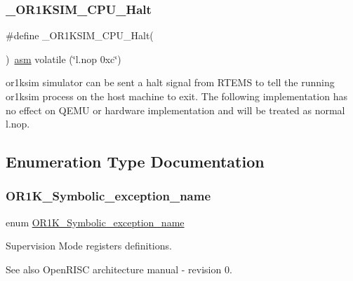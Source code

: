 \subsubsection{\texorpdfstring{\_OR1KSIM\_CPU\_Halt}{\_OR1KSIM\_CPU\_Halt}}
{\footnotesize\ttfamily \#define \+\_\+\+O\+R1\+K\+S\+I\+M\+\_\+\+C\+P\+U\+\_\+\+Halt(\begin{DoxyParamCaption}{ }\end{DoxyParamCaption})~\mbox{\hyperlink{group__RTEMSScoreCPUExample_ga04cbac6d343a5c80b8e4547131c6bfcd}{asm}} volatile (\char`\"{}l.\+nop 0xc\char`\"{})}



or1ksim simulator can be sent a halt signal from R\+T\+E\+MS to tell the running or1ksim process on the host machine to exit. The following implementation has no effect on Q\+E\+MU or hardware implementation and will be treated as normal l.\+nop. 



\subsection{Enumeration Type Documentation}
\mbox{\label{or1k-utility_8h_a1f2f3dd5f9aa087755d57e1b00f51553}} 
\subsubsection{\texorpdfstring{OR1K\_Symbolic\_exception\_name}{OR1K\_Symbolic\_exception\_name}}
{\footnotesize\ttfamily enum \mbox{\hyperlink{or1k-utility_8h_a1f2f3dd5f9aa087755d57e1b00f51553}{O\+R1\+K\+\_\+\+Symbolic\+\_\+exception\+\_\+name}}}



Supervision Mode registers definitions. 

\begin{DoxySeeAlso}{See also}
Open\+R\+I\+SC architecture manual -\/ revision 0. 
\end{DoxySeeAlso}
